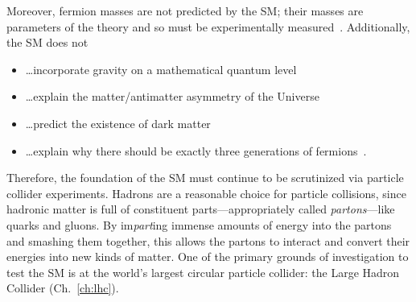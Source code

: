 Moreover, fermion masses are not predicted by the SM;
their masses are parameters of the theory and so must be experimentally measured~\cite{Halzen:1984mc}.
Additionally, the SM does not
\begin{itemize}
    \item \ldots incorporate gravity on a mathematical quantum level
    \item \ldots explain the matter/antimatter asymmetry of the Universe
    \item \ldots predict the existence of dark matter
    \item \ldots explain why there should be exactly three generations of fermions~\cite{particle_data_group_review_2020}.
\end{itemize}

Therefore, the foundation of the SM must continue to be scrutinized via particle collider experiments.
Hadrons are a reasonable choice for particle collisions, since hadronic matter is full of constituent parts---appropriately called \emph{partons}---like quarks and gluons.
By im\emph{part}ing immense amounts of energy into the partons and smashing them together, this allows the partons to interact and convert their energies into new kinds of matter.
One of the primary grounds of investigation to test the SM is at the world's largest circular particle collider: the Large Hadron Collider (Ch.~\ref{ch:lhc}).
